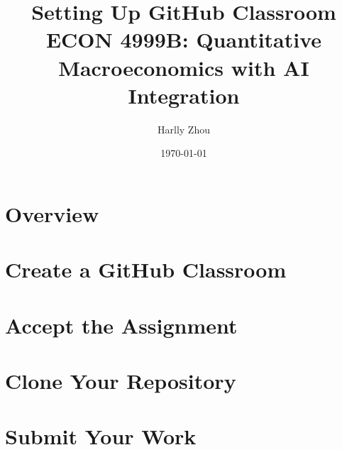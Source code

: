 \documentclass[12pt]{article}
\title{Setting Up GitHub Classroom\\ECON 4999B: Quantitative Macroeconomics with AI Integration}
\author{Harlly Zhou}
\date{\today}
\begin{document}
\maketitle

\section{Overview}

\section{Create a GitHub Classroom}

\section{Accept the Assignment}

\section{Clone Your Repository}

\section{Submit Your Work}
\end{document}

